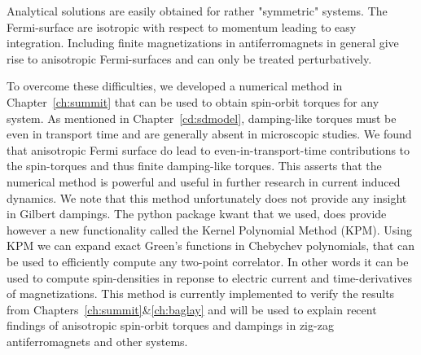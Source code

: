 Analytical solutions are easily obtained for rather "symmetric" systems. The Fermi-surface are isotropic with respect to momentum leading to easy integration. Including finite magnetizations in antiferromagnets in general give rise to anisotropic Fermi-surfaces and can only be treated perturbatively. 

To overcome these difficulties, we developed a numerical method in Chapter~\ref{ch:summit} that can be used to obtain spin-orbit torques for any system. As mentioned in Chapter~\ref{cd:sdmodel}, damping-like torques must be even in transport time and are generally absent in microscopic studies. We found that anisotropic Fermi surface do lead to even-in-transport-time contributions to the spin-torques and thus finite damping-like torques. This asserts that the numerical method is powerful and useful in further research in current induced dynamics. We note that this method unfortunately does not provide any insight in Gilbert dampings. The python package kwant that we used, does provide however a new functionality called the Kernel Polynomial Method (KPM). Using KPM we can expand exact Green's functions in Chebychev polynomials, that can be used to efficiently compute any two-point correlator. In other words it can be used to compute spin-densities in reponse to electric current and time-derivatives of magnetizations. This method is currently implemented to verify the results from Chapters~\ref{ch:summit}\&\ref{ch:baglay} and will be used to explain recent findings of anisotropic spin-orbit torques and dampings in zig-zag antiferromagnets and other systems.



